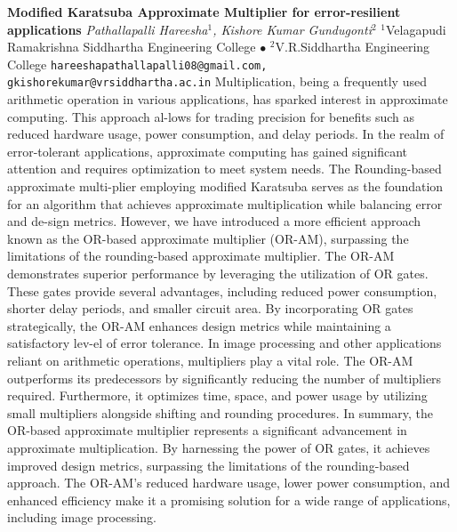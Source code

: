 
    \begin{conf-abstract}[]
        {\textbf{Modified Karatsuba Approximate Multiplier for error-resilient applications}}
        {\textit{Pathallapalli Hareesha$^{1}$, Kishore  Kumar Gundugonti$^{2}$}}
        {$^{1}$Velagapudi Ramakrishna Siddhartha Engineering College $\bullet$ $^{2}$V.R.Siddhartha Engineering College}
        {\texttt{hareeshapathallapalli08@gmail.com, gkishorekumar@vrsiddhartha.ac.in}}
        {Multiplication, being a frequently used arithmetic operation in various applications, has sparked interest in approximate computing. This approach al-lows for trading precision for benefits such as reduced hardware usage, power consumption, and delay periods. In the realm of error-tolerant applications, approximate computing has gained significant attention and requires optimization to meet system needs. The Rounding-based approximate multi-plier employing modified Karatsuba serves as the foundation for an algorithm that achieves approximate multiplication while balancing error and de-sign metrics. However, we have introduced a more efficient approach known as the OR-based approximate multiplier (OR-AM), surpassing the limitations of the rounding-based approximate multiplier. The OR-AM demonstrates superior performance by leveraging the utilization of OR gates. These gates provide several advantages, including reduced power consumption, shorter delay periods, and smaller circuit area. By incorporating OR gates strategically, the OR-AM enhances design metrics while maintaining a satisfactory lev-el of error tolerance. In image processing and other applications reliant on arithmetic operations, multipliers play a vital role. The OR-AM outperforms its predecessors by significantly reducing the number of multipliers required. Furthermore, it optimizes time, space, and power usage by utilizing small multipliers alongside shifting and rounding procedures. In summary, the OR-based approximate multiplier represents a significant advancement in approximate multiplication. By harnessing the power of OR gates, it achieves improved design metrics, surpassing the limitations of the rounding-based approach. The OR-AM's reduced hardware usage, lower power consumption, and enhanced efficiency make it a promising solution for a wide range of applications, including image processing.}
    \end{conf-abstract}
        